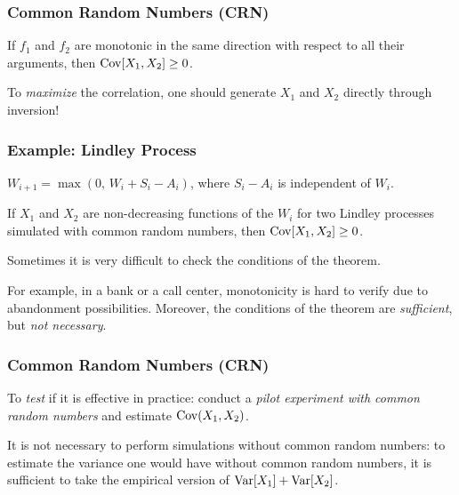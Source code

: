 \documentclass[t,usepdftitle=false,aspectratio=169]{beamer}
\begin{document}
\begin{frame}
	\frametitle{Common Random Numbers (CRN)}
	
	\begin{theorem}
		If $f_1$ and $f_2$ are monotonic in the same direction with respect to
		all their arguments, then  $\operatorname{Cov}[X_1, X_2] \ge 0$.
	\end{theorem}
	
	\mbox{}
	
	To \emph{maximize} the correlation, one should generate
	$X_1$ and $X_2$ directly through inversion!
	
\end{frame}
\begin{frame}
	\frametitle{Example: Lindley Process}
	
	${W_{i+1}} = \max(0,\, W_i + S_i - A_i)$, where $S_i - A_i$ is
	independent of $W_i$.
	
	\mbox{}
	
	If ${X_1}$ and ${X_2}$ are non-decreasing functions of the $W_i$
	for two Lindley processes simulated with common random numbers,
	then $\operatorname{Cov}[X_1, X_2] \ge 0$.
	
	\mbox{}
	
	Sometimes it is very difficult to check the conditions of the
	theorem.
	
	\mbox{}
	
	For example, in a bank or a call center, monotonicity
	is hard to verify due to abandonment possibilities.
	Moreover, the conditions of the theorem are \emph{sufficient}, but 
	\emph{not necessary}.
	
\end{frame}

\begin{frame}
	\frametitle{Common Random Numbers (CRN)}
	
	To \emph{test} if it is effective in practice:
	conduct a \emph{pilot experiment with common random numbers} and estimate 
	$\operatorname{Cov}(X_1, X_2)$.
	
	\mbox{}
	
	It is not necessary to perform simulations without common random numbers:
	to estimate the variance one would have without common random numbers,
	it is sufficient to take the empirical version of $\operatorname{Var}[X_1] + \operatorname{Var}[X_2]$.
	
\end{frame}
\end{document}
